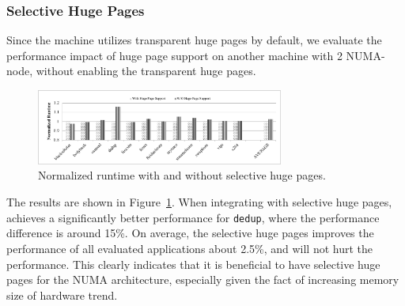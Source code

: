 \subsubsection{Selective Huge Pages} 
\label{sec:hugepage}

Since the machine utilizes transparent huge pages by default, we evaluate the performance impact of huge page support on another machine with 2 NUMA-node, without enabling the transparent huge pages.

\begin{figure}[!h]
    \centering
    \includegraphics[width=3.2in]{figure/hugepage.pdf}
    \caption{Normalized runtime with and without selective huge pages.}
    \label{fig:hugepage}
\end{figure}

The results are shown in Figure~\ref{fig:hugepage}. When integrating with selective huge pages, \NM{} achieves a significantly better performance for \texttt{dedup}, where the performance difference is around 15\%. On average, the selective huge pages improves the performance of all evaluated applications about 2.5\%, and will not hurt the performance. This clearly indicates that it is beneficial to have selective huge pages for the NUMA architecture, especially given the fact of increasing memory size of hardware trend.  


